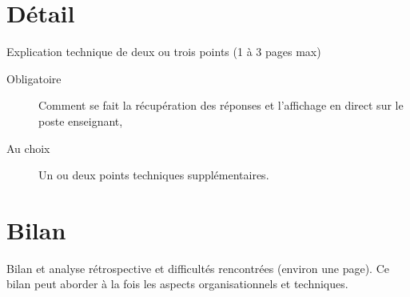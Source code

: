 \documentclass[a4paper, 12pt]{article}
\begin{document}
    
\section{Détail}

Explication technique de deux ou trois points (1 à 3 pages max)
\begin{description}
\item[Obligatoire] Comment se fait la récupération des réponses et l'affichage en direct sur le poste enseignant,
\item[Au choix] Un ou deux  points techniques supplémentaires.  
\end{description}

\section{Bilan}

Bilan et analyse rétrospective et difficultés rencontrées (environ une page). Ce bilan peut aborder à la fois les aspects organisationnels et techniques.

    
\end{document}
